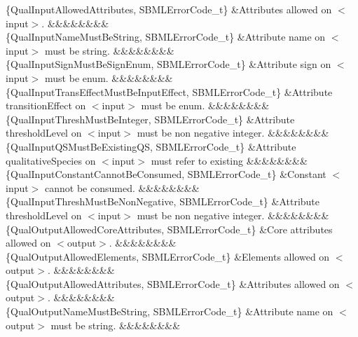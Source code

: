 \begin{DoxyParagraph}{}
\begin{longtabu}
\{Qual\+Input\+Allowed\+Attributes, S\+B\+M\+L\+Error\+Code\+\_\+t\} &Attributes allowed on {\ttfamily $<$input$>$}. &&&&&&&&\\
\{Qual\+Input\+Name\+Must\+Be\+String, S\+B\+M\+L\+Error\+Code\+\_\+t\} &Attribute \textquotesingle{}name\textquotesingle{} on {\ttfamily $<$input$>$} must be string. &&&&&&&&\\
\{Qual\+Input\+Sign\+Must\+Be\+Sign\+Enum, S\+B\+M\+L\+Error\+Code\+\_\+t\} &Attribute \textquotesingle{}sign\textquotesingle{} on {\ttfamily $<$input$>$} must be enum. &&&&&&&&\\
\{Qual\+Input\+Trans\+Effect\+Must\+Be\+Input\+Effect, S\+B\+M\+L\+Error\+Code\+\_\+t\} &Attribute \textquotesingle{}transition\+Effect\textquotesingle{} on {\ttfamily $<$input$>$} must be enum. &&&&&&&&\\
\{Qual\+Input\+Thresh\+Must\+Be\+Integer, S\+B\+M\+L\+Error\+Code\+\_\+t\} &Attribute \textquotesingle{}threshold\+Level\textquotesingle{} on {\ttfamily $<$input$>$} must be non negative integer. &&&&&&&&\\
\{Qual\+Input\+Q\+S\+Must\+Be\+Existing\+QS, S\+B\+M\+L\+Error\+Code\+\_\+t\} &Attribute \textquotesingle{}qualitative\+Species\textquotesingle{} on {\ttfamily $<$input$>$} must refer to existing &&&&&&&&\\
\{Qual\+Input\+Constant\+Cannot\+Be\+Consumed, S\+B\+M\+L\+Error\+Code\+\_\+t\} &Constant {\ttfamily $<$input$>$} cannot be consumed. &&&&&&&&\\
\{Qual\+Input\+Thresh\+Must\+Be\+Non\+Negative, S\+B\+M\+L\+Error\+Code\+\_\+t\} &Attribute \textquotesingle{}threshold\+Level\textquotesingle{} on {\ttfamily $<$input$>$} must be non negative integer. &&&&&&&&\\
\{Qual\+Output\+Allowed\+Core\+Attributes, S\+B\+M\+L\+Error\+Code\+\_\+t\} &Core attributes allowed on {\ttfamily $<$output$>$}. &&&&&&&&\\
\{Qual\+Output\+Allowed\+Elements, S\+B\+M\+L\+Error\+Code\+\_\+t\} &Elements allowed on {\ttfamily $<$output$>$}. &&&&&&&&\\
\{Qual\+Output\+Allowed\+Attributes, S\+B\+M\+L\+Error\+Code\+\_\+t\} &Attributes allowed on {\ttfamily $<$output$>$}. &&&&&&&&\\
\{Qual\+Output\+Name\+Must\+Be\+String, S\+B\+M\+L\+Error\+Code\+\_\+t\} &Attribute \textquotesingle{}name\textquotesingle{} on {\ttfamily $<$output$>$} must be string. &&&&&&&&\\

\end{longtabu}
\end{DoxyParagraph}
